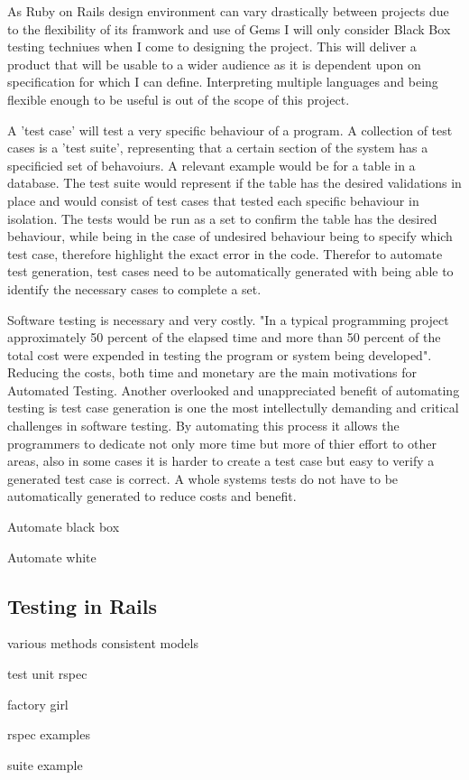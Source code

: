 \documentclass{article}
\begin{document}
\par As Ruby on Rails design environment can vary drastically between projects due to the flexibility of its framwork and use of Gems I will only consider Black Box testing techniues when I come to designing the project. This will deliver a product that will be usable to a wider audience as it is dependent upon on specification for which I can define. Interpreting multiple languages and being flexible enough to be useful is out of the scope of this project.
\par A 'test case' will test a very specific behaviour of a program. A collection of test cases is a 'test suite', representing that a certain section of the system has a specificied set of behavoiurs. A relevant example would be for a table in a database. The test suite would represent if the table has the desired validations in place and would consist of test cases that tested each specific behaviour in isolation. The tests would be run as a set to confirm the table has the desired behaviour, while being in the case of undesired behaviour being to specify which test case, therefore highlight the exact error in the code. Therefor to automate test generation, test cases need to be automatically generated with being able to identify the necessary cases to complete a set.
\par Software testing is necessary and very costly. "In a typical programming project approximately 50 percent of the elapsed time and more than 50 percent of the total cost were expended in testing the program or system being developed"\cite{myers2011art}. Reducing the costs, both time and monetary are the main motivations for Automated Testing. Another overlooked and unappreciated benefit of automating testing is test case generation is one the most intellectully demanding and critical challenges in software testing.\cite{anand2013orchestrated} By automating this process it allows the programmers to dedicate not only more time but more of thier effort to other areas, also in some cases it is harder to create a test case but easy to verify a generated test case is correct. A whole systems tests do not have to be automatically generated to reduce costs and benefit.
\par Automate black box
\par Automate white
\subsection{Testing in Rails}
\par various methods consistent models
\par test unit rspec
\par factory girl
\par rspec examples
\par suite example
\end{document}
